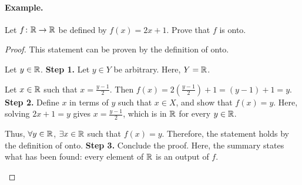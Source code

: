 \paragraph{Example.}
\begin{exercise}{
    Let $f \colon \mathbb{R} \to \mathbb{R}$ be defined by $f(x) = 2x + 1$. %
    Prove that $f$ is onto.
}
\end{exercise}
\begin{proof}{
    This statement can be proven by the definition of onto.

    \begin{annotatedpanel}[Setup.]{
        Let $y \in \mathbb{R}$.
    }{
        \textbf{Step 1.} Let $y \in Y$ be arbitrary. %
        Here, $Y = \mathbb{R}$.
    }
    \end{annotatedpanel}

    \begin{annotatedpanel}[Verification.]{
        Let $x \in \mathbb{R}$ such that $x = \frac{y - 1}{2}$. %
        Then $f(x) = 2\left(\frac{y - 1}{2}\right) + 1 = (y - 1) + 1 = y$.
    }{
        \textbf{Step 2.} Define $x$ in terms of $y$ such that $x \in X$, %
        and show that $f(x) = y$. %
        Here, solving $2x + 1 = y$ gives $x = \frac{y - 1}{2}$, %
        which is in $\mathbb{R}$ for every $y \in \mathbb{R}$.
    }
    \end{annotatedpanel}

    \begin{annotatedpanel}[Conclusion.]{
        Thus, $\forall y \in \mathbb{R}$, $\exists x \in \mathbb{R}$ such that $f(x) = y$. %
        Therefore, the statement holds by the definition of onto. \qedhere
    }{
        \textbf{Step 3.} Conclude the proof. %
        Here, the summary states what has been found: %
        every element of $\mathbb{R}$ is an output of $f$.
    }
    \end{annotatedpanel}
}
\end{proof}